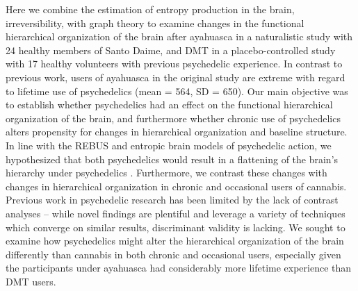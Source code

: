Here we combine the estimation of entropy production in the brain,
irreversibility, with graph theory to examine changes in the functional
hierarchical organization of the brain after ayahuasca in a naturalistic
study with 24 healthy members of Santo Daime, and DMT in a
placebo-controlled study with 17 healthy volunteers with previous
psychedelic experience. In contrast to previous work, users of ayahuasca
in the original study are extreme with regard to lifetime use of
psychedelics (mean = 564, SD = 650). Our main objective was to establish
whether psychedelics had an effect on the functional hierarchical
organization of the brain, and furthermore whether chronic use of
psychedelics alters propensity for changes in hierarchical organization
and baseline structure. In line with the REBUS and entropic brain models
of psychedelic action, we hypothesized that both psychedelics would
result in a flattening of the brain's hierarchy under psychedelics \parencite{Carhart-Harris2014,Carhart-Harris2019}.
Furthermore, we contrast these changes with changes in hierarchical
organization in chronic and occasional users of cannabis. Previous work
in psychedelic research has been limited by the lack of contrast
analyses -- while novel findings are plentiful and leverage a variety of
techniques which converge on similar results, discriminant validity is
lacking. We sought to examine how psychedelics might alter the
hierarchical organization of the brain differently than cannabis in both
chronic and occasional users, especially given the participants under
ayahuasca had considerably more lifetime experience than DMT users.